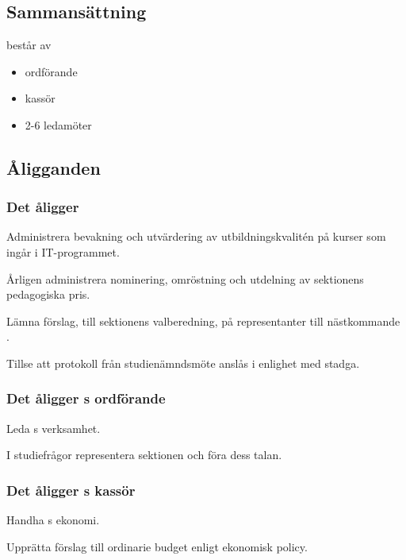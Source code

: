 \section{\SNITFULL}


\subsection{Sammansättning}
\SNIT{} består av
\begin{itemize}
    \item ordförande
    \item kassör
    \item 2-6 ledamöter
\end{itemize}

\subsection{Åligganden}

\subsubsection{Det åligger \SNIT}

\begin{att}
	\item Administrera bevakning och utvärdering av utbildningskvalitén på kurser som ingår i IT-programmet.
	\item Årligen administrera nominering, omröstning och utdelning av sektionens pedagogiska pris.
	\item Lämna förslag, till sektionens valberedning, på representanter till nästkommande \SNIT.
    \item Tillse att protokoll från studienämndsmöte anslås i enlighet med stadga.
\end{att}

\subsubsection{Det åligger \SNIT{}s ordförande}
\begin{att}
	\item Leda \SNIT{}s verksamhet.
	\item I studiefrågor representera sektionen och föra dess talan.
\end{att}

\subsubsection{Det åligger \SNIT{}s kassör}
\begin{att}
	\item Handha \SNIT{}s ekonomi.
	\item Upprätta förslag till ordinarie budget enligt ekonomisk policy.
\end{att}

